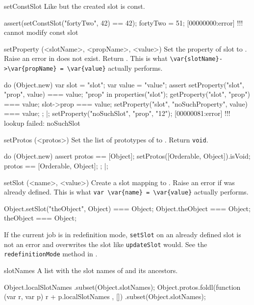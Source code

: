 \begin{urbiscriptapi}
\item[setConstSlot]%
  Like  but the created slot is const.
\begin{urbiscript}
assert(setConstSlot("fortyTwo", 42) == 42);
fortyTwo = 51;
[00000000:error] !!! cannot modify const slot
\end{urbiscript}

\item[setProperty](<slotName>, <propName>, <value>)%
  Set the property  of slot  to .
  Raise an error in  does not exist.  Return .
  This is what \lstinline|\var{slotName}->\var{propName} = \var{value}|
  actually performs.
\begin{urbiscript}
do (Object.new)
{
  var slot = "slot";
  var value = "value";
  assert
  {
    setProperty("slot", "prop", value) === value;
    "prop" in properties("slot");
    getProperty("slot", "prop") === value;
    slot->prop === value;
    setProperty("slot", "noSuchProperty", value) === value;
  };
}|;
setProperty("noSuchSlot", "prop", "12");
[00000081:error] !!! lookup failed: noSuchSlot
\end{urbiscript}


\item[setProtos](<protos>)%
  Set the list of prototypes of \this to .  Return
  \lstinline|void|.
\begin{urbiscript}
do (Object.new)
{
  assert
  {
    protos == [Object];
    setProtos([Orderable, Object]).isVoid;
    protos == [Orderable, Object];
  };
}|;
\end{urbiscript}

\item[setSlot](<name>, <value>)%
  Create a slot  mapping to . Raise an error if
   was already defined.  This is what
  \lstinline|var \var{name} = \var{value}| actually performs.
\begin{urbiassert}
Object.setSlot("theObject", Object) === Object;
Object.theObject === Object;
theObject === Object;
\end{urbiassert}

  If the current job is in redefinition mode, \lstinline|setSlot| on
  an already defined slot is not an error and overwrites the slot like
  \lstinline|updateSlot| would. See the \lstinline|redefinitionMode|
  method in .

\item[slotNames]%
  A list with the slot names of \this and its ancestors.
\begin{urbiassert}
Object.localSlotNames
  .subset(Object.slotNames);
Object.protos.foldl(function (var r, var p) { r + p.localSlotNames },
                    [])
  .subset(Object.slotNames);
\end{urbiassert}


\end{urbiscriptapi}
